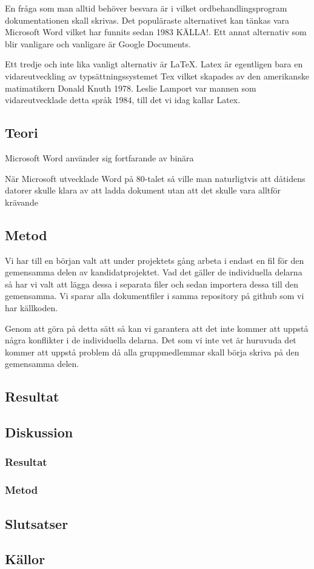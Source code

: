 En fråga som man alltid behöver besvara är i vilket ordbehandlingsprogram dokumentationen skall skrivas. Det populäraste 
alternativet kan tänkas vara Microsoft Word vilket har funnits sedan 1983 KÄLLA!. Ett annat 
alternativ som blir vanligare och vanligare är Google Documents.

Ett tredje och inte lika vanligt alternativ är \LaTeX. Latex är egentligen bara en vidareutveckling av typsättningssystemet 
Tex vilket skapades av den amerikanske matimatikern Donald Knuth 1978. Leslie Lamport var mannen som vidareutvecklade detta 
språk 1984, till det vi idag kallar Latex.

\subsection{Teori}
Microsoft Word använder sig fortfarande av binära

När Microsoft utvecklade Word på 80-talet så ville man naturligtvis att dåtidens datorer skulle klara av att ladda 
dokument utan att det skulle vara alltför krävande

\subsection{Metod}
Vi har till en början valt att under projektets gång arbeta i endast en fil för den gemensamma delen av kandidatprojektet. Vad det gäller 
de individuella delarna så har vi valt att lägga dessa i separata filer och sedan importera dessa till den gemensamma. Vi 
sparar alla dokumentfiler i samma repository på github som vi har källkoden.

Genom att göra på detta sätt så kan vi garantera att det inte kommer att uppstå några konflikter i de individuella delarna.
Det som vi inte vet är huruvuda det kommer att uppstå problem då alla gruppmedlemmar skall börja skriva på den gemensamma delen.

\subsection{Resultat}
\subsection{Diskussion}
\subsubsection{Resultat}
\subsubsection{Metod}
\subsection{Slutsatser}
\subsection{Källor}
